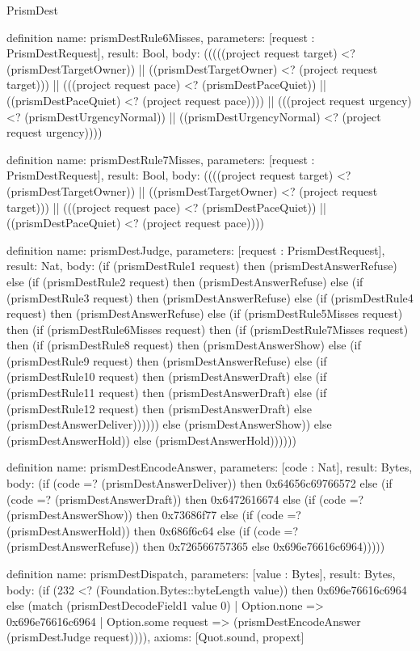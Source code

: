 \begin{lexlean}{PrismDest}
\begin{semanticmodule}
definition{
  name: prismDestRule6Misses,
  parameters: [request : PrismDestRequest],
  result: Bool,
  body: (((((project request target) <? (prismDestTargetOwner)) || ((prismDestTargetOwner) <? (project request target))) || (((project request pace) <? (prismDestPaceQuiet)) || ((prismDestPaceQuiet) <? (project request pace)))) || (((project request urgency) <? (prismDestUrgencyNormal)) || ((prismDestUrgencyNormal) <? (project request urgency))))
}

definition{
  name: prismDestRule7Misses,
  parameters: [request : PrismDestRequest],
  result: Bool,
  body: ((((project request target) <? (prismDestTargetOwner)) || ((prismDestTargetOwner) <? (project request target))) || (((project request pace) <? (prismDestPaceQuiet)) || ((prismDestPaceQuiet) <? (project request pace))))
}

definition{
  name: prismDestJudge,
  parameters: [request : PrismDestRequest],
  result: Nat,
  body: (if (prismDestRule1 request) then (prismDestAnswerRefuse) else (if (prismDestRule2 request) then (prismDestAnswerRefuse) else (if (prismDestRule3 request) then (prismDestAnswerRefuse) else (if (prismDestRule4 request) then (prismDestAnswerRefuse) else (if (prismDestRule5Misses request) then (if (prismDestRule6Misses request) then (if (prismDestRule7Misses request) then (if (prismDestRule8 request) then (prismDestAnswerShow) else (if (prismDestRule9 request) then (prismDestAnswerRefuse) else (if (prismDestRule10 request) then (prismDestAnswerDraft) else (if (prismDestRule11 request) then (prismDestAnswerDraft) else (if (prismDestRule12 request) then (prismDestAnswerDraft) else (prismDestAnswerDeliver)))))) else (prismDestAnswerShow)) else (prismDestAnswerHold)) else (prismDestAnswerHold))))))
}

definition{
  name: prismDestEncodeAnswer,
  parameters: [code : Nat],
  result: Bytes,
  body: (if (code =? (prismDestAnswerDeliver)) then 0x64656c69766572 else (if (code =? (prismDestAnswerDraft)) then 0x6472616674 else (if (code =? (prismDestAnswerShow)) then 0x73686f77 else (if (code =? (prismDestAnswerHold)) then 0x686f6c64 else (if (code =? (prismDestAnswerRefuse)) then 0x726566757365 else 0x696e76616c6964)))))
}

definition{
  name: prismDestDispatch,
  parameters: [value : Bytes],
  result: Bytes,
  body: (if (232 <? (Foundation.Bytes::byteLength value)) then 0x696e76616c6964 else (match (prismDestDecodeField1 value 0)
    | Option.none => 0x696e76616c6964
    | Option.some request => (prismDestEncodeAnswer (prismDestJudge request)))),
  axioms: [Quot.sound, propext]
}
\end{semanticmodule}
\end{lexlean}
